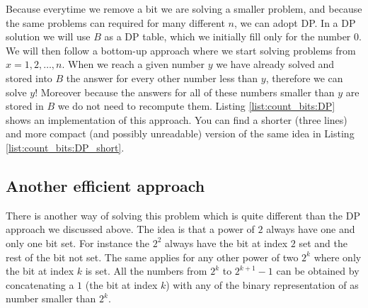 Because everytime we remove a bit we are solving a smaller problem, 
and because the same problems can required for many different $n$, we can adopt DP.
In a DP solution we will use $B$ as a DP table, which we initially fill only for the number $0$. 
We will then follow a bottom-up approach where we start solving problems from $x=1,2,\ldots,n$. When we reach a given number $y$
we have already solved and stored into $B$ the answer for every other number less than $y$, therefore we can solve $y$! 
Moreover because the answers for all of these numbers smaller than $y$ are stored in $B$
we do not need to recompute them.
Listing \ref{list:count_bits:DP} shows an implementation of this approach. 
You can find a shorter (three lines) and more compact (and possibly unreadable) version of the same idea in Listing \ref{list:count_bits:DP_short}.





\subsection{Another efficient approach}
\label{count_bits:sec:pattern}
There is another way of solving this problem which is quite different than the DP approach we discussed above.
The idea is that a power of $2$ always have one and only one bit set. For instance the $2^2$ always have the bit at index $2$ set and the rest of the bit not set.
The same applies for any other power of two $2^k$ where only the bit at index $k$ is set.
All the numbers from $2^k$ to $2^{k+1}-1$ can be obtained by concatenating a $1$ (the bit at index $k$)
with any of the binary representation of as number smaller than $2^k$.

